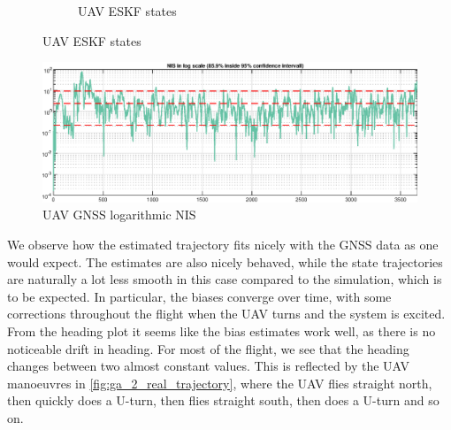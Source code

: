 \begin{figure}[ht]
\begin{subfigure}[b]{0.45\textwidth}
        \caption{UAV ESKF states}
        \label{fig:ga_2_real_state}
	\end{subfigure}
    \label{fig:ga_2_real_trajectory_state}
\end{figure}

\begin{figure}[!htb]
    \centering
    \includegraphics[width=0.8\linewidth]{figures/ga_2/real_consistency.eps}
    \caption{UAV GNSS logarithmic NIS}
    \label{fig:ga_2_real_consistency}
\end{figure}

We observe how the estimated trajectory fits nicely with the GNSS data as one would expect. The estimates are also nicely behaved, while the state trajectories are naturally a lot less smooth in this case compared to the simulation, which is to be expected. In particular, the biases converge over time, with some corrections throughout the flight when the UAV turns and the system is excited. From the heading plot it seems like the bias estimates work well, as there is no noticeable drift in heading. For most of the flight, we see that the heading changes between two almost constant values. This is reflected by the UAV manoeuvres in \cref{fig:ga_2_real_trajectory}, where the UAV flies straight north, then quickly does a U-turn, then flies straight south, then does a U-turn and so on. 

